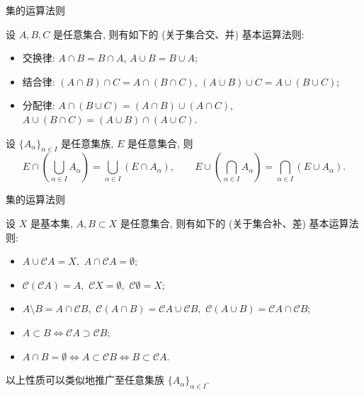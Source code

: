\begin{frame}{集的运算法则}

\begin{thm}[交、并的基本运算法则]
设 $A, B, C$ 是任意集合, 则有如下的 (关于集合交、并) 基本运算法则:
\begin{itemize}
\item \alert{交换律}: $A \cap B = B \cap A$, $A \cup B = B \cup A$;
\item \alert{结合律}: $(A \cap B) \cap C = A \cap (B \cap C)$, $(A \cup B) \cup C = A \cup (B \cup C)$;
\item \alert{分配律}: $A \cap (B \cup C) = (A \cap B) \cup (A \cap C)$, $A \cup (B \cap C) = (A \cup B) \cap (A \cup C)$.
\end{itemize}
\end{thm}

\pause
\vspace{0.5em}

\begin{cor}
设 $\{A_\alpha\}_{\alpha \in I}$ 是任意集族, $E$ 是任意集合, 则
\[
E \cap \!\left(\bigcup_{\alpha \in I} A_\alpha\right) = \bigcup_{\alpha \in I} (E \cap A_\alpha),
\qquad
E \cup \!\left(\bigcap_{\alpha \in I} A_\alpha\right) = \bigcap_{\alpha \in I} (E \cup A_\alpha).
\]
\end{cor}

\end{frame}


\begin{frame}{集的运算法则}

\begin{prop}[补、差的基本运算法则]
设 $X$ 是基本集, $A, B \subset X$ 是任意集合, 则有如下的 (关于集合补、差) 基本运算法则:
\begin{itemize}
\item $A \cup \mathscr{C}A = X,$ $A \cap \mathscr{C}A = \emptyset$;
\item $\mathscr{C}(\mathscr{C}A) = A,$ $\mathscr{C} X = \emptyset,$ $\mathscr{C} \emptyset = X$;
\item $A \setminus B = A \cap \mathscr{C}B,$ $\mathscr{C}(A \cap B) = \mathscr{C}A \cup \mathscr{C}B,$ $\mathscr{C}(A \cup B) = \mathscr{C}A \cap \mathscr{C}B$;
\item $A \subset B \iff \mathscr{C}A \supset \mathscr{C}B$;
\item $A \cap B = \emptyset \iff A \subset \mathscr{C}B \iff B \subset \mathscr{C}A$.
\end{itemize}
\end{prop}

\vspace{0.5em}

以上性质可以类似地推广至任意集族 $\{A_\alpha\}_{\alpha \in I}.$

\end{frame}

